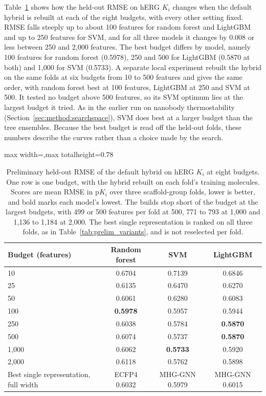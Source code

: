 Table~\ref{tab:prelim_budget} shows how the held-out RMSE on hERG $K_i$ changes when the default hybrid is rebuilt at each of the eight budgets, with every other setting fixed. RMSE falls steeply up to about 100 features for random forest and LightGBM and up to 250 features for SVM, and for all three models it changes by 0.008 or less between 250 and 2,000 features. The best budget differs by model, namely 100 features for random forest (0.5978), 250 and 500 for LightGBM (0.5870 at both) and 1,000 for SVM (0.5733). A separate local experiment rebuilt the hybrid on the same folds at six budgets from 10 to 500 features and gives the same order, with random forest best at 100 features, LightGBM at 250 and SVM at 500. It tested no budget above 500 features, so its SVM optimum lies at the largest budget it tried. As in the earlier run on nanobody thermostability (Section~\ref{sec:method:searchspace}), SVM does best at a larger budget than the tree ensembles. Because the best budget is read off the held-out folds, these numbers describe the curves rather than a choice made by the search.

\begin{table}[htbp]
\centering
\small
\begin{adjustbox}{max width=\textwidth,max totalheight=0.78\textheight}
\begin{tabular}{@{}lccc@{}}
\toprule
Budget (features) & Random forest & SVM & LightGBM \\
\midrule
10 & 0.6704 & 0.7139 & 0.6846 \\
25 & 0.6135 & 0.6470 & 0.6270 \\
50 & 0.6061 & 0.6280 & 0.6083 \\
100 & \textbf{0.5978} & 0.5957 & 0.5944 \\
250 & 0.6038 & 0.5784 & \textbf{0.5870} \\
500 & 0.6074 & 0.5737 & \textbf{0.5870} \\
1,000 & 0.6062 & \textbf{0.5733} & 0.5920 \\
2,000 & 0.6118 & 0.5762 & 0.5898 \\
\midrule
Best single representation, full width & ECFP4 0.6032 & MHG-GNN 0.5979 & MHG-GNN 0.6015 \\
\bottomrule
\end{tabular}
\end{adjustbox}
\caption[Preliminary: held-out RMSE against budget on hERG $K_i$.]{Preliminary held-out RMSE of the default hybrid on hERG $K_i$ at eight budgets. One row is one budget, with the hybrid rebuilt on each fold's training molecules. Scores are mean RMSE in p$K_i$ over three scaffold-group folds, lower is better, and bold marks each model's lowest. The builds stop short of the budget at the largest budgets, with 499 or 500 features per fold at 500, 771 to 793 at 1,000 and 1,136 to 1,184 at 2,000. The best single representation is ranked on all three folds, as in Table~\ref{tab:prelim_variants}, and is not reselected per fold.}
\label{tab:prelim_budget}
\end{table}


